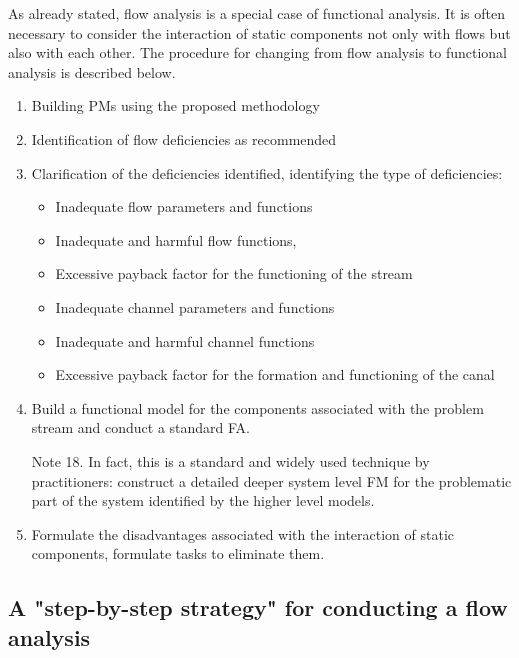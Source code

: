 \documentclass[a4paper,11pt]{article}
\begin{document}
As already stated, flow analysis is a special case of functional analysis. It
is often necessary to consider the interaction of static components not only
with flows but also with each other. The procedure for changing from flow
analysis to functional analysis is described below.
\begin{enumerate}
\item Building PMs using the proposed methodology
\item Identification of flow deficiencies as recommended
\item Clarification of the deficiencies identified, identifying the type of
  deficiencies:
  \begin{itemize}
  \item Inadequate flow parameters and functions
  \item Inadequate and harmful flow functions,
  \item Excessive payback factor for the functioning of the stream
  \item Inadequate channel parameters and functions
  \item Inadequate and harmful channel functions
  \item Excessive payback factor for the formation and functioning of the
    canal
  \end{itemize}
\item Build a functional model for the components associated with the problem
  stream and conduct a standard FA.

  Note 18. In fact, this is a standard and widely used technique by
  practitioners: construct a detailed deeper system level FM for the
  problematic part of the system identified by the higher level models.

\item Formulate the disadvantages associated with the interaction of static
  components, formulate tasks to eliminate them.
\end{enumerate}

\subsection{A "step-by-step strategy" for conducting a flow analysis}
\end{document}
